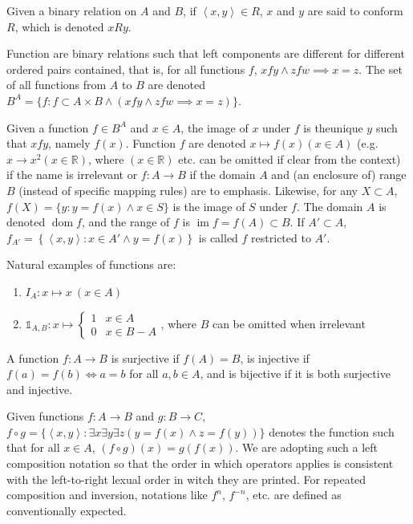 \documentclass{book}
\theoremstyle{definition}\newtheorem{mechanism}{Mechanism}
\theoremstyle{remark}\newtheorem*{remark}{Remark}
\begin{document}
Given a binary relation on $A$ and $B$, if $\left<x, y\right>\in R$, $x$ and $y$ are said to conform $R$, which is denoted $xRy$.

Function are binary relations such that left components are different for different ordered pairs contained, that is, for all functions $f$, $xfy \land zfw \implies x = z$. The set of all functions from $A$ to $B$ are denoted $B^A = \{f: f\subset A\times B \land(xfy \land zfw\implies x = z)\}$. 

Given a function $f \in B^A$ and $x\in A$, the image of $x$ under $f$ is theunique $y$ such that $xfy$, namely $f(x)$. Function $f$ are denoted $x\mapsto f(x)(x\in A)$ (e.g. $x\to x^2(x\in\mathbb R)$, where $(x\in \mathbb R)$ etc. can be omitted if clear from the context) if the name is irrelevant or $f: A\to B$ if the domain $A$ and (an enclosure of) range $B$ (instead of specific mapping rules) are to emphasis. Likewise, for any $X\subset A$, $f(X) = \{y:y = f(x)\land x\in S\}$ is the image of $S$ under $f$. The domain $A$ is denoted $\operatorname{dom} f$, and the range of $f$ is $\operatorname{im} f = f(A) \subset B$. If $A'\subset A$, $f_{A'} = \left\{\left<x, y\right>: x\in A'\land y = f(x)\right\}$ is called $f$ restricted to $A'$.

Natural examples of functions are:

\begin{enumerate}
	\item $I_A: x\mapsto x~(x\in A)$
	\item $\mathbb 1_{A, B}: x\mapsto \begin{cases}
		1 & x\in A\\
		0 & x\in B - A
	\end{cases}$, where $B$ can be omitted when irrelevant
\end{enumerate}

A function $f: A\to B$ is surjective if $f(A) = B$, is injective if $f(a)  = f(b) \iff a = b$ for all $a, b \in A$, and is bijective if it is both surjective and injective.

Given functions $f: A\to B$ and $g: B\to C$, $f\circ g = \{\left<x, y\right>: \exists x\exists y\exists z(y = f(x) \land z = f(y))\}$ denotes the function such that for all $x\in A$, $(f\circ g)(x) = g(f(x))$. We are adopting such a left composition notation so that the order in which operators applies is consistent with the left-to-right lexual order in witch they are printed. For repeated composition and inversion, notations like $f^{n}$, $f^{-n}$, etc. are defined as conventionally expected.
\end{document}
